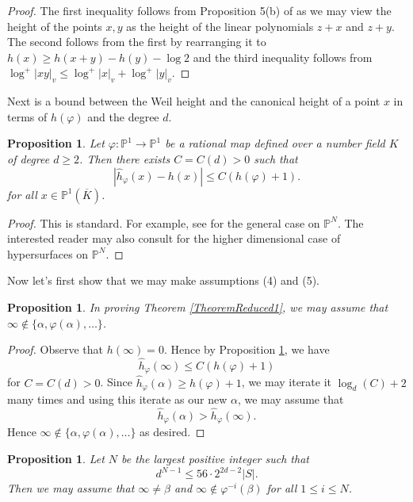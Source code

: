 \documentclass[10pt, reqno]{amsart}
\newcommand{\bb}{\mathbb}
\newcommand{\vphi}{\varphi}
\newcommand{\ovl}{\overline}
\newcommand{\h}{\widehat{h}}
\numberwithin{theorem}{section}
\newtheorem{proposition}[theorem]{Proposition}
\numberwithin{equation}{section}
\numberwithin{example}{section}
\numberwithin{definition}{section}
\begin{document}
\begin{proof}
The first inequality follows from Proposition 5(b) of \cite{HS11} as we may view the height of the points $x,y$ as the height of the linear polynomials $z+x$ and $z+y$. The second follows from the first by rearranging it to
$h(x) \geq h(x+y) - h(y) - \log 2$ and the third inequality follows from $\log^+|xy|_v \leq \log^+|x|_v + \log^+|y|_v$.
\end{proof}

Next is a bound between the Weil height and the canonical height of a point $x$ in terms of $h(\vphi)$ and the degree $d$. 

\begin{proposition} \label{Heights2}
Let $\vphi: \bb{P}^1 \to \bb{P}^1$ be a rational map defined over a number field $K$ of degree $d \geq 2$. Then there exists $C = C(d) > 0$ such that
\begin{equation} \label{eq:Heights2}
|\h_{\vphi}(x) - h(x)| \leq   C (h(\vphi)+1).
\end{equation}
for all $x \in \bb{P}^1(\ovl{K})$.
\end{proposition}

\begin{proof}
This is standard. For example, see \cite[Theorem 3.11]{Sil07} for the general case on $\bb{P}^N$. The interested reader may also consult \cite{Ing22} for the higher dimensional case of hypersurfaces on $\bb{P}^N$.
\end{proof}

Now let's first show that we may make assumptions (4) and (5). 

\begin{proposition} \label{Assumption1}
In proving Theorem \ref{TheoremReduced1}, we may assume that $\infty \not \in \{\alpha,\vphi(\alpha),\ldots\}$. 
\end{proposition}

\begin{proof}
Observe that $h(\infty) = 0$. Hence by Proposition \ref{Heights2}, we have 
$$\h_{\vphi}(\infty) \leq C (h(\vphi)+1)$$
for $C = C(d) > 0$. 
Since $\h_{\vphi}(\alpha) \geq h(\vphi)+1$, we may iterate it $\log_d(C) + 2$ many times and using this iterate as our new $\alpha$, we may assume that 
$$\h_{\vphi}(\alpha) > \h_{\vphi}(\infty).$$
Hence $\infty \not \in \{\alpha,\vphi(\alpha),\ldots\}$ as desired. 
\end{proof}

\begin{proposition} \label{Assumption2} 
Let $N$ be the largest positive integer such that 
$$d^{N-1} \leq 56 \cdot 2^{2d-2} |S|.$$
Then we may assume that $\infty \not = \beta$ and  $\infty \not \in \vphi^{-i}(\beta)$ for all $1 \leq i \leq N$.  
\end{proposition}
\end{document}
